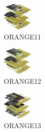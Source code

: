 \hspace{0.1cm}
\begin{minipage}[b]{0.15\linewidth}
\begin{figure}[H]                                                          
  \centering                                                             
  \begin{adjustbox}{width=1.5cm,center}                                   
  \includegraphics[width=1.5cm]{src/colorspace_colourflow/flows/colourflow_251-45.png}%
  \end{adjustbox}                                                        
\caption*{ORANGE11}                                           
\end{figure}                                                               
\end{minipage}
\hspace{0.1cm}
\begin{minipage}[b]{0.15\linewidth}
\begin{figure}[H]                                                          
  \centering                                                             
  \begin{adjustbox}{width=1.5cm,center}                                   
  \includegraphics[width=1.5cm]{src/colorspace_colourflow/flows/colourflow_252-45.png}%
  \end{adjustbox}                                                        
\caption*{ORANGE12}                                           
\end{figure}                                                               
\end{minipage}
\hspace{0.1cm}
\begin{minipage}[b]{0.15\linewidth}
\begin{figure}[H]                                                          
  \centering                                                             
  \begin{adjustbox}{width=1.5cm,center}                                   
  \includegraphics[width=1.5cm]{src/colorspace_colourflow/flows/colourflow_253-45.png}%
  \end{adjustbox}                                                        
\caption*{ORANGE13}                                           
\end{figure}                                                               
\end{minipage}
